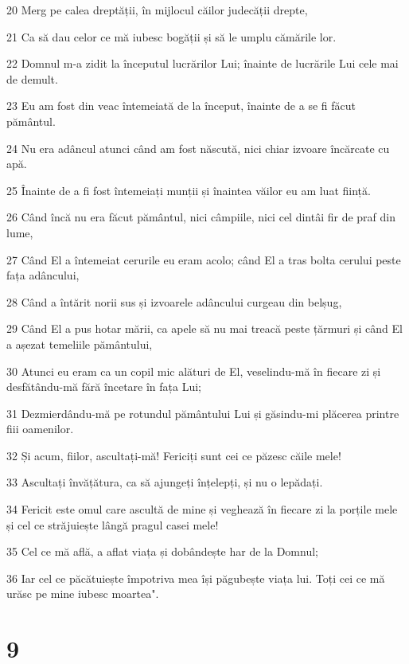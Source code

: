\par 20 Merg pe calea dreptății, în mijlocul căilor judecății drepte,
\par 21 Ca să dau celor ce mă iubesc bogății și să le umplu cămările lor.
\par 22 Domnul m-a zidit la începutul lucrărilor Lui; înainte de lucrările Lui cele mai de demult.
\par 23 Eu am fost din veac întemeiată de la început, înainte de a se fi făcut pământul.
\par 24 Nu era adâncul atunci când am fost născută, nici chiar izvoare încărcate cu apă.
\par 25 Înainte de a fi fost întemeiați munții și înaintea văilor eu am luat ființă.
\par 26 Când încă nu era făcut pământul, nici câmpiile, nici cel dintâi fir de praf din lume,
\par 27 Când El a întemeiat cerurile eu eram acolo; când El a tras bolta cerului peste fața adâncului,
\par 28 Când a întărit norii sus și izvoarele adâncului curgeau din belșug,
\par 29 Când El a pus hotar mării, ca apele să nu mai treacă peste țărmuri și când El a așezat temeliile pământului,
\par 30 Atunci eu eram ca un copil mic alături de El, veselindu-mă în fiecare zi și desfătându-mă fără încetare în fața Lui;
\par 31 Dezmierdându-mă pe rotundul pământului Lui și găsindu-mi plăcerea printre fiii oamenilor.
\par 32 Și acum, fiilor, ascultați-mă! Fericiți sunt cei ce păzesc căile mele!
\par 33 Ascultați învățătura, ca să ajungeți înțelepți, și nu o lepădați.
\par 34 Fericit este omul care ascultă de mine și veghează în fiecare zi la porțile mele și cel ce străjuiește lângă pragul casei mele!
\par 35 Cel ce mă află, a aflat viața și dobândește har de la Domnul;
\par 36 Iar cel ce păcătuiește împotriva mea își păgubește viața lui. Toți cei ce mă urăsc pe mine iubesc moartea".

\chapter{9}

